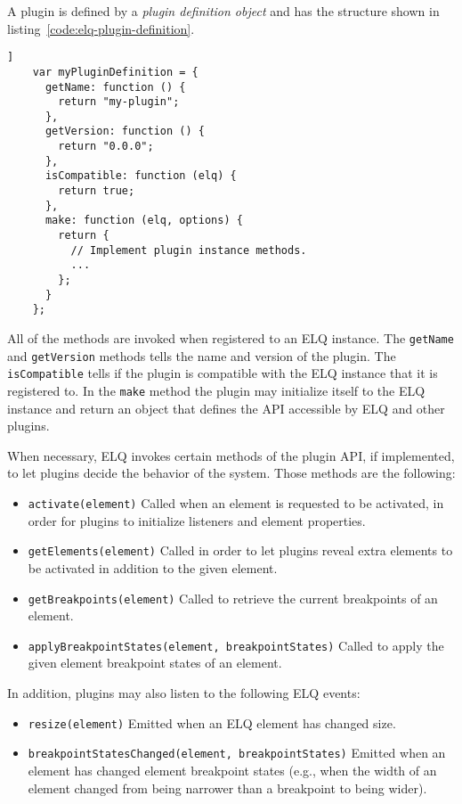 \documentclass{acm_proc_article-sp}
\newcommand{\code}[1]{\texttt{#1}}
\newcommand{\elq}{ELQ}
\begin{document}
  A plugin is defined by a \emph{plugin definition object} and has the structure shown in listing~\ref{code:elq-plugin-definition}.
  \begin{lstlisting}[gobble=4,caption={The structure of plugin definition objects.},captionpos=b,label={code:elq-plugin-definition}]]
    var myPluginDefinition = {
      getName: function () {
        return "my-plugin";
      },
      getVersion: function () {
        return "0.0.0";
      },
      isCompatible: function (elq) {
        return true;
      },
      make: function (elq, options) {
        return {
          // Implement plugin instance methods.
          ...
        };
      }
    };
  \end{lstlisting}

  All of the methods are invoked when registered to an \elq{} instance.
  The \code{getName} and \code{getVersion} methods tells the name and version of the plugin.
  The \code{isCompatible} tells if the plugin is compatible with the \elq{} instance that it is registered to.
  In the \code{make} method the plugin may initialize itself to the \elq{} instance and return an object that defines the API accessible by \elq{} and other plugins.

  When necessary, \elq{} invokes certain methods of the plugin API, if implemented, to let plugins decide the behavior of the system.
  Those methods are the following:
  \begin{itemize}
    \item \code{activate(element)}
          Called when an element is requested to be activated, in order for plugins to initialize listeners and element properties.
    \item \code{getElements(element)}
          Called in order to let plugins reveal extra elements to be activated in addition to the given element.
    \item \code{getBreakpoints(element)}
          Called to retrieve the current breakpoints of an element.
    \item \code{applyBreakpointStates(element, breakpointStates)}
          Called to apply the given element breakpoint states of an element.
  \end{itemize}

  In addition, plugins may also listen to the following \elq{} events:
  \begin{itemize}
    \item \code{resize(element)}
          Emitted when an \elq{} element has changed size.
    \item \code{breakpointStatesChanged(element, breakpointStates)}
          Emitted when an element has changed element breakpoint states (e.g., when the width of an element changed from being narrower than a breakpoint to being wider).
  \end{itemize}
\end{document}
